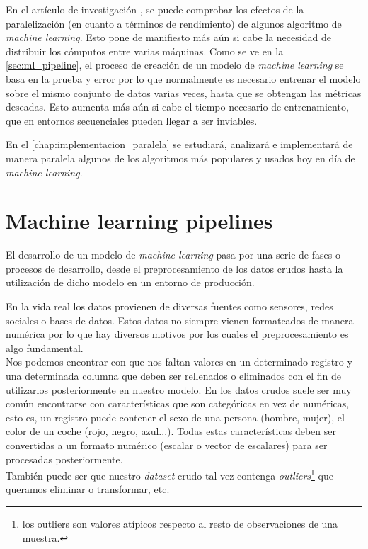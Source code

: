 En el artículo de investigación \cite{NIPS2006_3150}, se puede comprobar los efectos de la paralelización
(en cuanto a términos de rendimiento) de algunos algoritmo de \textit{machine learning}. Esto pone de
manifiesto más aún si cabe la necesidad de distribuir los cómputos entre varias máquinas. Como se ve en
la \autoref{sec:ml_pipeline}, el proceso de creación de un modelo de \textit{machine learning} se basa en
la prueba y error por lo que normalmente es necesario entrenar el modelo sobre el mismo conjunto de datos
varias veces, hasta que se obtengan las métricas deseadas. Esto aumenta más aún si cabe el tiempo necesario
de entrenamiento, que en entornos secuenciales pueden llegar a ser inviables.
\newline

En el \autoref{chap:implementacion_paralela} se estudiará, analizará e implementará de manera paralela 
algunos de los algoritmos más populares y usados hoy en día de \textit{machine learning}.

\section{Machine learning pipelines}\label{sec:ml_pipeline}
El desarrollo de un modelo de \textit{machine learning} pasa por una serie de fases o procesos de desarrollo,
desde el preprocesamiento de los datos crudos hasta la utilización de dicho modelo en un entorno
de producción.

En la vida real los datos provienen de diversas fuentes como sensores, redes sociales o bases de datos.
Estos datos no siempre vienen formateados de manera numérica por lo que
hay diversos motivos por los cuales el preprocesamiento es algo fundamental.\\
Nos podemos encontrar con que nos faltan valores en un determinado registro y una determinada columna
que deben ser rellenados o eliminados con el fin de utilizarlos posteriormente en nuestro modelo.
En los datos crudos suele ser muy común encontrarse con características que son categóricas en 
vez de numéricas, esto es, un registro puede contener el sexo de una persona (hombre, mujer), el color 
de un coche (rojo, negro, azul...). 
Todas estas características deben ser convertidas a un formato numérico (escalar o vector de escalares) 
para ser procesadas posteriormente.\\
También puede ser que nuestro \textit{dataset} crudo tal vez contenga 
\textit{outliers}\footnote{los outliers son valores atípicos  respecto al resto de observaciones 
de una muestra.} que queramos eliminar o transformar, etc.
\newline

